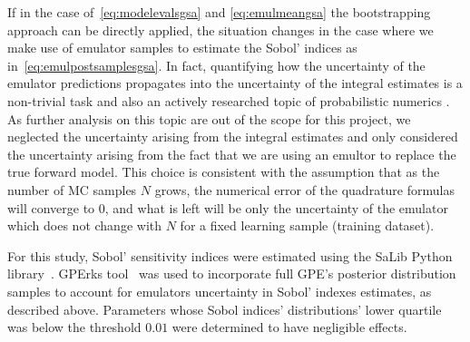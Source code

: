 \vspace{0.2cm}\noindent
If in the case of~\eqref{eq:modelevalsgsa} and \eqref{eq:emulmeangsa} the bootstrapping approach can be directly applied, the situation changes in the case where we make use of emulator samples to estimate the Sobol' indices as in~\eqref{eq:emulpostsamplesgsa}. In fact, quantifying how the uncertainty of the emulator predictions propagates into the uncertainty of the integral estimates is a non-trivial task and also an actively researched topic of probabilistic numerics . As further analysis on this topic are out of the scope for this project, we neglected the uncertainty arising from the integral estimates and only considered the uncertainty arising from the fact that we are using an emultor to replace the true forward model. This choice is consistent with the assumption that as the number of MC samples $N$ grows, the numerical error of the quadrature formulas will converge to $0$, and what is left will be only the uncertainty of the emulator which does not change with $N$ for a fixed learning sample (training dataset).

\vspace{0.2cm}
 For this study, Sobol' sensitivity indices were estimated using the SaLib Python library~\cite{Herman:2017}. GPErks tool~\cite{Longobardi:2021} was used to incorporate full GPE's posterior distribution samples to account for emulators uncertainty in Sobol' indexes estimates, as described above. Parameters whose Sobol indices' distributions' lower quartile was below the threshold $0.01$ were determined to have negligible effects.